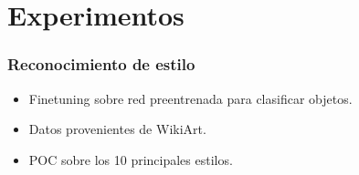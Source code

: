 \documentclass[10pt,center]{beamer}
\begin{document}
\section{Experimentos}
\begin{frame}
  \frametitle{Reconocimiento de estilo}
  \begin{itemize}
    \item Finetuning sobre red preentrenada para clasificar objetos. \vspace{0.5cm}
    \item Datos provenientes de WikiArt. \vspace{0.5cm}
    \item POC sobre los 10 principales estilos. \vspace{0.5cm}
  \end{itemize}
\end{frame}
\end{document}
